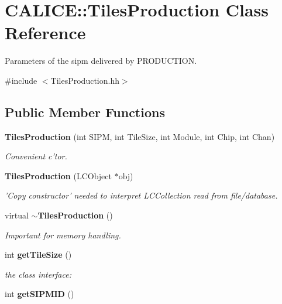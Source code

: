 \section{CALICE::TilesProduction Class Reference}
\label{classCALICE_1_1TilesProduction}


Parameters of the sipm delivered by PRODUCTION.  


{\ttfamily \#include $<$TilesProduction.hh$>$}\subsection*{Public Member Functions}
\begin{DoxyCompactItemize}
\item 
{\bf TilesProduction} (int SIPM, int TileSize, int Module, int Chip, int Chan)\label{classCALICE_1_1TilesProduction_aaae665726387c446a308232ed3243340}

\begin{DoxyCompactList}\small\item\em Convenient c'tor. \item\end{DoxyCompactList}\item 
{\bf TilesProduction} (LCObject $\ast$obj)\label{classCALICE_1_1TilesProduction_a24af53b6d0bc286ec0e4348a24fb461a}

\begin{DoxyCompactList}\small\item\em 'Copy constructor' needed to interpret LCCollection read from file/database. \item\end{DoxyCompactList}\item 
virtual {\bf $\sim$TilesProduction} ()\label{classCALICE_1_1TilesProduction_abc1f291e49c75e4c61920ed7f77cd2d6}

\begin{DoxyCompactList}\small\item\em Important for memory handling. \item\end{DoxyCompactList}\item 
int {\bf getTileSize} ()\label{classCALICE_1_1TilesProduction_a9b0ce86037b8292cb5d51b453f25b065}

\begin{DoxyCompactList}\small\item\em the class interface: \item\end{DoxyCompactList}\item 
int {\bfseries getSIPMID} ()\label{classCALICE_1_1TilesProduction_ab040f65159706d933c8b2d251782fa86}


\end{DoxyCompactItemize}
